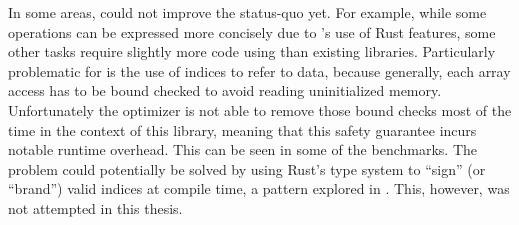 In some areas,  could not improve the status-quo yet.
For example, while some operations can be expressed more concisely due to 's use of Rust features, some other tasks require slightly more code using  than existing \cpp libraries.
Particularly problematic for  is the use of indices to refer to data, because generally, each array access has to be bound checked to avoid reading uninitialized memory.
Unfortunately the optimizer is not able to remove those bound checks most of the time in the context of this library, meaning that this safety guarantee incurs notable runtime overhead.
This can be seen in some of the benchmarks.
The problem could potentially be solved by using Rust's type system to \enquote{sign} (or \enquote{brand}) valid indices at compile time, a pattern explored in \cite[Chapter~6.3]{beingessner2016you}.
This, however, was not attempted in this thesis.
